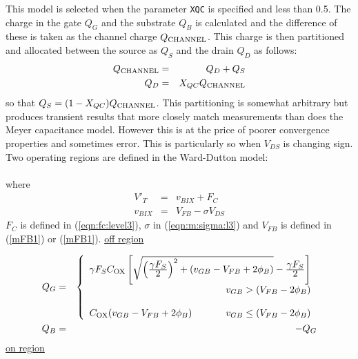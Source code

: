 This model is selected when the parameter {\tt XQC} is specified and less than
0.5.
The charge in the gate $Q_G$ and the substrate $Q_B$ is calculated and the
difference of these is taken as the channel charge $Q_{\mbox{\scriptsize CHANNEL}}$.
This charge is then partitioned and allocated between the source
as $Q_S$ and the drain $Q_D$ as follows:
\begin{eqnarray}
Q_{\mbox{\scriptsize CHANNEL}} & = & Q_D + Q_S \\
Q_D         & = & X_{QC} Q_{\mbox{\scriptsize CHANNEL}}\\
\end{eqnarray}
so that $Q_S          =  (1 - X_{QC}) Q_{\mbox{\scriptsize CHANNEL}}$.
This partitioning is somewhat arbitrary but produces transient results
that more closely match measurements than does the Meyer capacitance model.
However this is at the price of poorer convergence properties and sometimes
error. This is particularly so when $V_{DS}$ is changing sign.
Two operating regions are defined in the Ward-Dutton model:\\[0.1in]
\hspace*{\fill}\\[0.1in]
\noindent where
 \begin{eqnarray}
  V'_T &=& v_{BIX} + F_C\\
  v_{BIX} &=& V_{FB} - \sigma V_{DS}
\end{eqnarray}
$F_C$ is defined in (\ref{eqn:fc:level3}), $\sigma$ in (\ref{eqn:m:sigma:l3}) and
$V_{FB}$ is defined in (\ref{mFB1}) or (\ref{mFB1}).
\underline{off region}

\begin{eqnarray}
       Q_G &=& 
      \left\{ \begin{array}{l}
       \gamma F_S C_{\ms{OX}} \left[
         \sqrt{ \left({{\textstyle \gamma F_S}\over{\textstyle 2}}\right)^2
         + (v_{GB}-V_{FB}+\PHI) } - 
         {{\textstyle\gamma F_S}\over{\textstyle 2}} \right]\\
      \hspace*{\fill} v_{GB} > (V_{FB}-\PHI)\\
      \\
      C_{\ms{OX}} (v_{GB}-V_{FB}+\PHI)
      \hspace*{\fill} v_{GB} \le (V_{FB}-\PHI)
      \end{array} \right. %
      \\
    Q_B &=& -Q_G
\end{eqnarray}
\underline{on region}


